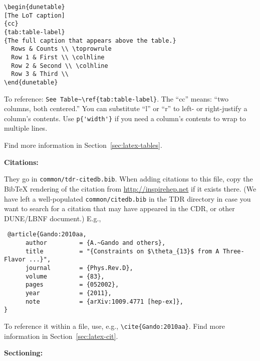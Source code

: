 \begin{framed}
\begin{verbatim}
\begin{dunetable}
[The LoT caption]
{cc}
{tab:table-label}
{The full caption that appears above the table.}
  Rows & Counts \\ \toprowrule
  Row 1 & First \\ \colhline
  Row 2 & Second \\ \colhline
  Row 3 & Third \\ 
\end{dunetable}
\end{verbatim}
To reference: \verb|See Table~\ref{tab:table-label}|. The ``cc'' means: ``two columns, both centered.'' You can substitute ``l'' or ``r'' to left- or right-justify a column's contents. Use \verb|p{'width'}| if you need a column's contents to wrap to multiple lines.

Find more information in Section~\ref{sec:latex-tables}.
\end{framed}
\textbf{Citations:}
\begin{framed}
They go in \texttt{common/tdr-citedb.bib}. When adding citations to this file, copy the BibTeX rendering of the citation from \url{http://inspirehep.net} if it exists there. (We have left a well-populated \texttt{common/citedb.bib} in the TDR directory in case you want to search for a citation
 that may have appeared in the CDR, or other DUNE/LBNF document.) E.g.,

\begin{verbatim}
 @article{Gando:2010aa,
      author         = {A.~Gando and others},
      title          = "{Constraints on $\theta_{13}$ from A Three-Flavor ...}",
      journal        = {Phys.Rev.D},
      volume         = {83},
      pages          = {052002},
      year           = {2011},
      note           = {arXiv:1009.4771 [hep-ex]},
}
\end{verbatim}
 To reference it within a file, use, e.g.,  \verb|\cite{Gando:2010aa}|.
Find more information in Section~\ref{sec:latex-cit}.
\end{framed}

\textbf{Sectioning:}


